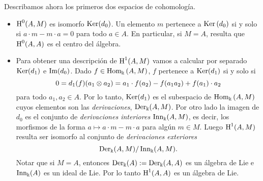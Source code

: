 \documentclass[a4paper,oneside,fleqn,11pt,../tesis.tex]{subfiles}
\begin{document}
Describamos ahora los primeros dos espacios de cohomología.
\begin{itemize}
	\item $\operatorname{H}^{0}(A, M)$ es isomorfo $\operatorname{Ker}(d_0)$.
	Un elemento $m$ pertenece a $\operatorname{Ker}\left(d_0\right)$ si y solo si $a\cdot m - m \cdot a = 0$ para todo $a \in A$. En particular,
	si $M = A$, resulta que $\operatorname{H}^{0}(A, A)$ es el centro del álgebra.
	
	\item Para obtener una descripción de $\operatorname{H}^{1}(A, M)$ vamos a calcular por separado $\operatorname{Ker}(d_1)$
	e $\operatorname{Im}(d_0)$. Dado $f \in \operatorname{Hom}_{\Bbbk}\left(A, M\right)$, $f$ pertenece a $\operatorname{Ker}(d_1)$ si y solo si
	\[
		0 = d_1(f)(a_1\otimes a_2) = a_1\cdot f(a_2) - f(a_1 a_2) + f(a_1)\cdot a_2
	\]
	para todo $a_1, a_2 \in A$. Por lo tanto, $\operatorname{Ker}(d_1)$ es el subespacio de $\operatorname{Hom}_{\Bbbk}\left(A, M\right)$
	cuyos elementos son las \emph{derivaciones}, $\operatorname{Der}_{\Bbbk}(A, M)$. Por otro lado
	la imagen de $d_0$ es el conjunto de \emph{derivaciones interiores} $\operatorname{Inn}_{\Bbbk}(A, M)$, es decir, los morfismos de la forma
	$a \mapsto a\cdot m - m\cdot a$ para algún $m \in M$. Luego $\operatorname{H}^{1}(A, M)$ resulta ser isomorfo al conjunto de \emph{derivaciones exteriores}
	\[
		\operatorname{Der}_{\Bbbk}(A, M) / \operatorname{Inn}_{\Bbbk}(A, M).
	\]
	Notar que si $M = A$, entonces $\operatorname{Der}_{\Bbbk}(A) := \operatorname{Der}_{\Bbbk}(A,A)$ es un álgebra de Lie e $\operatorname{Inn}_{\Bbbk}(A)$ es un ideal de Lie.
	Por lo tanto $\operatorname{H}^{1}(A, A)$ es un álgebra de Lie.
\end{itemize}
\end{document}
